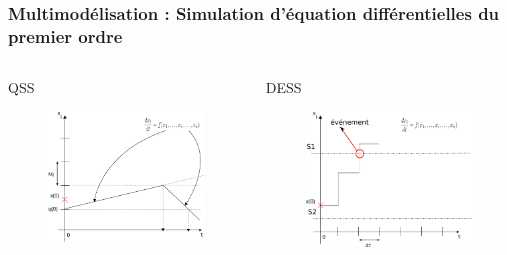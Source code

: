 \documentclass[xetex, compress, table, dvipsnames]{beamer}
\begin{document}
\begin{frame}
  \frametitle{Multimodélisation : Simulation d'équation
    différentielles du premier ordre}
  \begin{columns}
    \begin{column}{0.48\textwidth}
      \begin{block}{QSS}
        \begin{figure}[h]
          \begin{center}
            \includegraphics[width=\textwidth]{qss2}
          \end{center}
        \end{figure}
      \end{block}
    \end{column}
    \begin{column}{0.48\textwidth}
      \begin{block}{DESS}
        \begin{figure}[h]
          \begin{center}
            \includegraphics[width=\textwidth]{dess2}

\end{center}
\end{figure}
\end{block}
\end{column}
\end{columns}
\end{frame}
\end{document}
